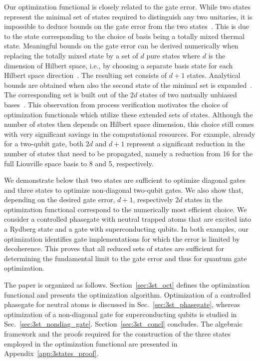 Our optimization functional is closely related to the gate error.
While two states represent the minimal set of states required to
distinguish any two unitaries, it is impossible to deduce bounds on
the gate error from the two
states~\cite{ReichKochPRA13}. This is due to the state corresponding to
the choice of basis being a totally mixed thermal state. Meaningful
bounds on the gate error can be derived numerically when replacing the totally
mixed state by a set of $d$ pure states where $d$ is the dimension of
Hilbert space, i.e., by choosing a separate basis state for each
Hilbert space direction~\cite{ReichKochPRA13,FiurasekPRA14}. The resulting set
consists of $d+1$ states. Analytical bounds are obtained when also the
second state of the minimal set is expanded~\cite{HofmannPRL05}. The
corresponding set is built out of the $2d$ states of two mutually
unbiased bases~\cite{ReichKochPRA13}. This observation from process
verification motivates the choice of optimization functionals which
utilize these extended sets of states. Although the
number of states then depends on Hilbert space dimension, this choice still
comes with very significant savings in the computational resources.
For example, already for a two-qubit gate,
both $2d$ and $d+1$ represent a significant reduction in the number of
states that need to be propagated, namely a reduction from 16 for the
full Liouville space basis to 8 and 5, respectively.

We demonstrate below that two states are sufficient to
optimize diagonal gates and three states to optimize non-diagonal
two-qubit gates. We also show that, depending on the desired gate
error, $d+1$, respectively $2d$ states in the optimization functional
correspond to the numerically most efficient choice. We consider a
controlled phasegate  with neutral trapped atoms that are excited into
a Rydberg state and a \sqrtISWAP gate with
superconducting qubits. In both examples, our optimization identifies
gate implementations for which the error is limited by
decoherence. This proves that all reduced sets of states are
sufficient for determining the fundamental limit to the gate error and
thus for quantum gate optimization.

The paper is organized as follows. Section~\ref{sec:3st_oct} defines
the optimization functional and presents the optimization
algorithm. Optimization of a controlled phasegate for neutral atoms is
discussed in Sec.~\ref{sec:3st_phasegate}, whereas optimization of a
non-diagonal gate for superconducting qubits is studied in
Sec.~\ref{sec:3st_nondiag_gate}. Section~\ref{sec:3st_concl}
concludes.
The algebraic framework and the proofs required for the construction
of the three states employed in the optimization functional are
presented in Appendix~\ref{app:3states_proof}.


